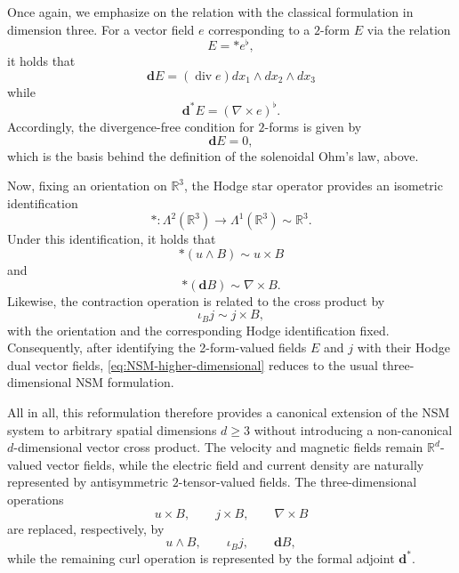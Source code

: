 \documentclass[11pt, leqno, a4paper,]{amsart}
\theoremstyle{remark}
\numberwithin{equation}{section}
\renewcommand*{\div}{\operatorname{div}}
\begin{document}
Once again, we emphasize on the relation with the classical formulation in dimension three. For a vector field $e$ corresponding to a $2$-form $E$ via the relation 
 \begin{equation*}
 	E=* e ^\flat,
 \end{equation*}
 it holds that 
 \begin{equation*}
 	\textbf{d} E=  (\div e) dx_1 \wedge dx_2 \wedge  dx_3
 \end{equation*}
 while 
 \begin{equation*}
 	\textbf{d}^*E=(\nabla \times e)^\flat. 
 \end{equation*}
 Accordingly, the divergence-free condition for $2$-forms is given by 
 \begin{equation*}
 	\textbf{d} E = 0,
 \end{equation*}
 which is the basis behind the definition of the solenoidal Ohm's law, above. 
 
 Now, fixing an orientation on $\mathbb R
^3$, the Hodge star operator provides an isometric identification
\begin{equation*}
	* : \Lambda^2 (\mathbb R^3) \to \Lambda ^1 (\mathbb R^3) \sim \mathbb R^3.
\end{equation*}
Under this identification, it holds that 
\begin{equation*}
	* (u\wedge B)\sim  u\times B 
\end{equation*}
and 
\begin{equation*}
	* (\textbf{d} B)\sim \nabla \times B.
\end{equation*}
Likewise, the contraction operation is related to the cross product by
\begin{equation*}
	\iota_B j \sim j\times B,
\end{equation*}
with the orientation and the corresponding Hodge identification fixed. Consequently, after identifying the 2-form-valued fields $E$ and $j$ with their Hodge dual vector fields, \eqref{eq:NSM-higher-dimensional} reduces to the usual three-dimensional NSM formulation.

All in all, this reformulation therefore provides a canonical extension of the NSM system to arbitrary spatial dimensions $d\geq 3$ without introducing a non-canonical $d$-dimensional vector cross product. The velocity and magnetic fields remain $\mathbb R^d$-valued vector fields, while the electric field and current density are naturally represented by antisymmetric $2$-tensor-valued fields. The three-dimensional operations 
\begin{equation}\label{vector:notation:3}
	u\times B, \qquad  j\times B, \qquad \nabla \times B
\end{equation}
 are replaced, respectively, by
\begin{equation}\label{vector:notation:d}
	u \wedge B, \qquad \iota_B j , \qquad \mathbf dB,
\end{equation}
while the remaining curl operation is represented by the formal adjoint $\mathbf d^*$.
\end{document}
